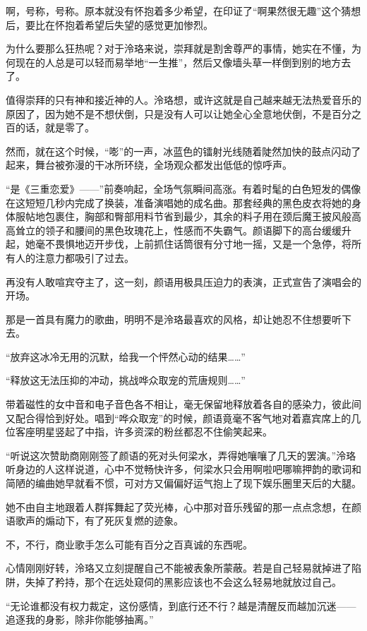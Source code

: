 \documentclass[UTF8, scheme = chinese, openany]{ctexbook}
\begin{document}
啊，号称，号称。原本就没有怀抱着多少希望，在印证了“啊果然很无趣”这个猜想后，要比在怀抱着希望后失望的感觉更加惨烈。

为什么要那么狂热呢？对于泠珞来说，崇拜就是割舍尊严的事情，她实在不懂，为何现在的人总是可以轻而易举地“一生推”，然后又像墙头草一样倒到别的地方去了。

值得崇拜的只有神和接近神的人。泠珞想，或许这就是自己越来越无法热爱音乐的原因了，因为她不是不想伏倒，只是没有人可以让她全心全意地伏倒，不是百分之百的话，就是零了。

然而，就在这个时候，“嘭”的一声，冰蓝色的镭射光线随着陡然加快的鼓点闪动了起来，舞台被弥漫的干冰所环绕，全场观众都发出低低的惊呼声。

“是《三重恋爱》——”前奏响起，全场气氛瞬间高涨。有着时髦的白色短发的偶像在这短短几秒内完成了换装，准备演唱她的成名曲。那套经典的黑色皮衣将她的身体服帖地包裹住，胸部和臀部用料节省到最少，其余的料子用在颈后魔王披风般高高耸立的领子和腰间的黑色玫瑰花上，性感而不失霸气。颜语脚下的高台缓缓升起，她毫不畏惧地迈开步伐，上前抓住话筒很有分寸地一摇，又是一个急停，将所有人的注意力都吸引了过去。

再没有人敢喧宾夺主了，这一刻，颜语用极具压迫力的表演，正式宣告了演唱会的开场。

那是一首具有魔力的歌曲，明明不是泠珞最喜欢的风格，却让她忍不住想要听下去。

“放弃这冰冷无用的沉默，给我一个怦然心动的结果……”

“释放这无法压抑的冲动，挑战哗众取宠的荒唐规则……”

带着磁性的女中音和电子音色各不相让，毫无保留地释放着各自的感染力，彼此间又配合得恰到好处。唱到“哗众取宠”的时候，颜语竟毫不客气地对着嘉宾席上的几位客座明星竖起了中指，许多资深的粉丝都忍不住偷笑起来。

“听说这次赞助商刚刚签了颜语的死对头何梁水，弄得她嚷嚷了几天的罢演。”泠珞听身边的人这样说道，心中不觉畅快许多，何梁水只会用啊啦吧哪嘛押韵的歌词和简陋的编曲她早就看不惯，可对方又偏偏好运气抱上了现下娱乐圈里天后的大腿。

她不由自主地跟着人群挥舞起了荧光棒，心中那对音乐残留的那一点点念想，在颜语歌声的煽动下，有了死灰复燃的迹象。

不，不行，商业歌手怎么可能有百分之百真诚的东西呢。

心情刚刚好转，泠珞又立刻提醒自己不能被表象所蒙蔽。若是自己轻易就掉进了陷阱，失掉了矜持，那个在远处窥伺的黑影应该也不会这么轻易地就放过自己。

“无论谁都没有权力裁定，这份感情，到底行还不行？越是清醒反而越加沉迷——追逐我的身影，除非你能够抽离。”
\end{document}

